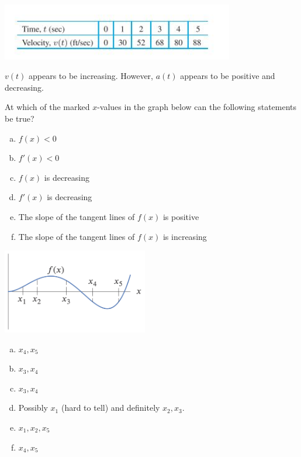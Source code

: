 \documentclass[11pt]{exam}
\begin{document}
\begin{questions}
\includegraphics[width=4in]{table.jpg}
\begin{solution}
  \(v(t)\) appears to be increasing. However, \(a(t)\) appears to be
  positive and decreasing.
\end{solution}
\question At which of the marked \(x\)-values in the graph below can
  the following statements be true?\\
  \begin{minipage}{0.6\linewidth}
    \begin{enumerate}[(a)]
    \item \(f(x) < 0\)
    \item \(f'(x) < 0\)
    \item \(f(x)\) is decreasing
    \item \(f'(x)\) is decreasing
    \item The slope of the tangent lines of \(f(x)\) is positive
    \item The slope of the tangent lines of \(f(x)\) is increasing
    \end{enumerate}
  \end{minipage}
  \begin{minipage}{0.4\linewidth}
    \includegraphics[width=2.5in]{figure256}
  \end{minipage}
  \begin{solution}
    \begin{enumerate}[(a)]
    \item \(x_4,x_5\)
    \item \(x_3,x_4\)
    \item \(x_3,x_4\)
    \item Possibly \(x_1\) (hard to tell) and definitely \(x_2,x_3\).
    \item \(x_1, x_2, x_5\)
    \item \(x_4, x_5\)
    \end{enumerate}

\end{solution}
\end{questions}
\end{document}
